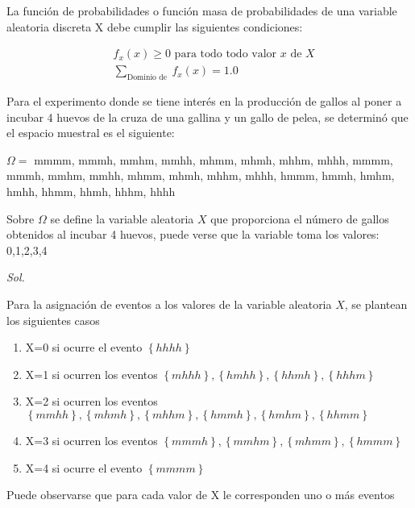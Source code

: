 La función de probabilidades o función masa de probabilidades de
una variable aleatoria discreta X debe cumplir las siguientes
condiciones:

\begin{align}
     & f_x(x)\geq 0 \text{ para todo todo valor } x\text{ de } X \\
     & \sum_{\text{Dominio de }} f_x(x)=1.0
\end{align}

\begin{example}
    Para el experimento donde se tiene interés en la
    producción de gallos al poner a incubar 4 huevos de
    la cruza de una gallina y un gallo de pelea, se
    determinó que el espacio muestral es el siguiente:

    $\Omega=$ mmmm, mmmh, mmhm, mmhh, mhmm, mhmh, mhhm, mhhh, mmmm, mmmh, mmhm, mmhh, mhmm, mhmh, mhhm, mhhh, hmmm, hmmh, hmhm, hmhh, hhmm, hhmh, hhhm, hhhh

    Sobre $\Omega$ se define la variable aleatoria $X$ que proporciona el número de gallos obtenidos al incubar 4 huevos, puede verse que la variable toma los valores: 0,1,2,3,4
\end{example}

\textit{ Sol.}

Para la asignación de eventos a los valores de la variable aleatoria $X$, se plantean los siguientes casos

\begin{enumerate}
    \item X=0 si ocurre el evento $\left\{ hhhh\right\}$
    \item X=1 si ocurren los eventos $\left\{ mhhh\right\},\left\{ hmhh\right\},\left\{ hhmh\right\},\left\{ hhhm\right\}$

    \item X=2 si ocurren los eventos $\left\{ mmhh\right\} ,\left\{ mhmh\right\} ,\left\{ mhhm\right\},\left\{ hmmh\right\} ,
              \left\{ hmhm\right\} ,\left\{ hhmm\right\}$

    \item X=3 si ocurren los eventos $\left\{ mmmh\right\} ,\left\{mmhm\right\},\left\{mhmm\right\},\left\{hmmm\right\}$

    \item X=4 si ocurre el evento $\left\{ mmmm\right\}$
\end{enumerate}

Puede observarse que para cada valor de X le corresponden uno o más
eventos

